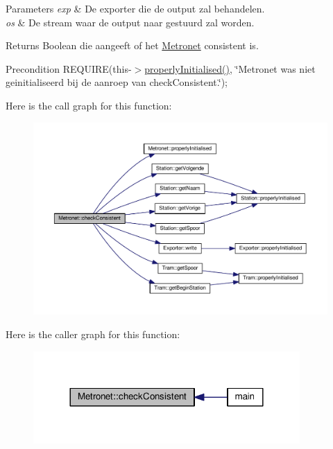 \begin{DoxyParams}{Parameters}
{\em exp} & De exporter die de output zal behandelen. \\
\hline
{\em os} & De stream waar de output naar gestuurd zal worden. \\
\hline
\end{DoxyParams}
\begin{DoxyReturn}{Returns}
Boolean die aangeeft of het \hyperlink{class_metronet}{Metronet} consistent is. 
\end{DoxyReturn}
\begin{DoxyPrecond}{Precondition}
R\+E\+Q\+U\+I\+RE(this-\/$>$\hyperlink{class_metronet_a3d2adce29a947f162924279b766de645}{properly\+Initialised()}, \char`\"{}\+Metronet was niet geinitialiseerd bij de aanroep van check\+Consistent.\char`\"{}); 
\end{DoxyPrecond}
Here is the call graph for this function\+:\nopagebreak
\begin{figure}[H]
\begin{center}
\leavevmode
\includegraphics[width=350pt]{class_metronet_a3125e980b208f1cdd04a9c26ec92a7bf_cgraph}
\end{center}
\end{figure}
Here is the caller graph for this function\+:\nopagebreak
\begin{figure}[H]
\begin{center}
\leavevmode
\includegraphics[width=288pt]{class_metronet_a3125e980b208f1cdd04a9c26ec92a7bf_icgraph}
\end{center}
\end{figure}
\mbox{\label{class_metronet_a756f8163c67c4e559699b9c508fb1346}} 
